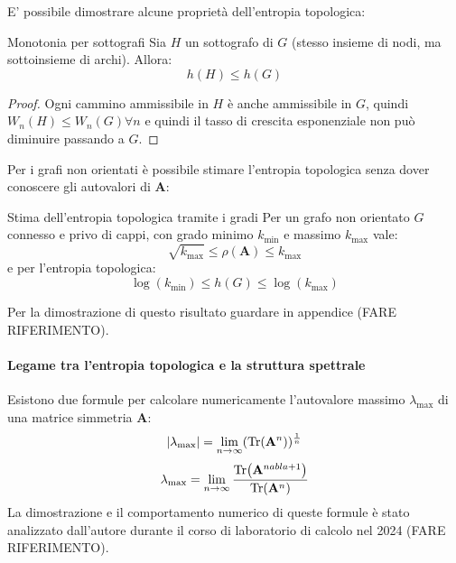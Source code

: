 E' possibile dimostrare alcune proprietà dell'entropia topologica:
\begin{boxl}{Monotonia per sottografi}
    Sia $H$ un sottografo di $G$ (stesso insieme di nodi, ma sottoinsieme di archi). Allora: 
    \begin{equation}
        h(H) \le h(G)
    \end{equation}
\end{boxl}
\begin{proof}
    Ogni cammino ammissibile in $H$ è anche ammissibile in $G$, quindi $W_n(H) \le W_n(G) \forall n$ e quindi il tasso di crescita esponenziale non può diminuire passando a $G$.
\end{proof}
Per i grafi non orientati è possibile stimare l'entropia topologica senza dover conoscere gli autovalori di $\mathbf{A}$:
\begin{boxl} {Stima dell'entropia topologica tramite i gradi}
    Per un grafo non orientato $G$ connesso e privo di cappi, con grado minimo $k_{\text{min}}$ e massimo $k_{\text{max}}$ vale:
    \begin{equation}
        \sqrt{k_{\text{max}}} \le \rho(\mathbf{A}) \le k_{\text{max}}
    \end{equation}
    e per l'entropia topologica:
    \begin{equation}
        \log(k_{\text{min}}) \le  h(G) \le \log(k_{\text{max}})
    \end{equation}
\end{boxl}
Per la dimostrazione di questo risultato guardare in appendice (FARE RIFERIMENTO).

\paragraph{Legame tra l'entropia topologica e la struttura spettrale}
Esistono due formule per calcolare numericamente l'autovalore massimo $\lambda_{\text{max}}$ di una matrice simmetria $\mathbf{A}$:
\begin{equation}
    \left\lvert \lambda_{\text{max}} \right\rvert= \lim_{n \to \infty} (\Tr(\mathbf{A}^n))^{\frac{1}{n}}
\end{equation}
\begin{equation}
    \lambda_{\text{max}}=\lim_{n \to \infty} \frac{\Tr(\mathbf{A}^{nabla+1})}{\Tr(\mathbf{A}^n)}
\end{equation}
La dimostrazione e il comportamento numerico di queste formule è stato analizzato dall'autore durante il corso di laboratorio di calcolo nel 2024 (FARE RIFERIMENTO).\\

